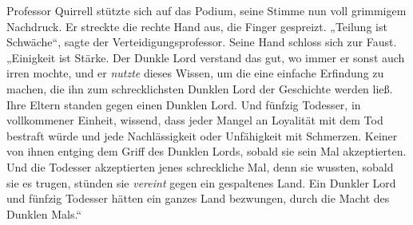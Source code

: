 Professor Quirrell stützte sich auf das Podium, seine Stimme nun voll grimmigem Nachdruck. Er streckte die rechte Hand aus, die Finger gespreizt.
„Teilung ist Schwäche“, sagte der Verteidigungsprofessor. Seine Hand schloss sich zur Faust.
„Einigkeit ist Stärke. Der Dunkle Lord verstand das gut, wo immer er sonst auch irren mochte, und er \emph{nutzte} dieses Wissen, um die eine einfache Erfindung zu machen, die ihn zum schrecklichsten Dunklen Lord der Geschichte werden ließ. Ihre Eltern standen gegen einen Dunklen Lord. Und fünfzig Todesser, in vollkommener Einheit, wissend, dass jeder Mangel an Loyalität mit dem Tod bestraft würde und jede Nachlässigkeit oder Unfähigkeit mit Schmerzen. Keiner von ihnen entging dem Griff des Dunklen Lords, sobald sie sein Mal akzeptierten. Und die Todesser akzeptierten jenes schreckliche Mal, denn sie wussten, sobald sie es trugen, stünden sie \emph{vereint} gegen ein gespaltenes Land. Ein Dunkler Lord und fünfzig Todesser hätten ein ganzes Land bezwungen, durch die Macht des Dunklen Mals.“

